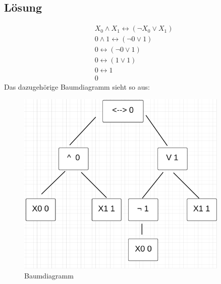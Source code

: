 \documentclass[12pt, a4paper]{article}
\begin{document}
\subsection*{Lösung}
\begin{equation}
\begin{split}
&X_0 \wedge X_1 \leftrightarrow ( \neg X_0 \vee X_1)\\
&0 \wedge 1 \leftrightarrow (\neg 0 \vee 1)\\
&0 \leftrightarrow (\neg 0 \vee 1)\\
&0 \leftrightarrow (1 \vee 1)\\
&0 \leftrightarrow 1\\
&0
\end{split}
\end{equation}
Das dazugehörige Baumdiagramm sieht so aus:
\begin{figure}[H] 
		\centering
		\includegraphics[page=1, width=0.9\textwidth]{a1-sem}
		\caption{Baumdiagramm} 
		\label{Baumdiagramm}
\end{figure}
\end{document}
